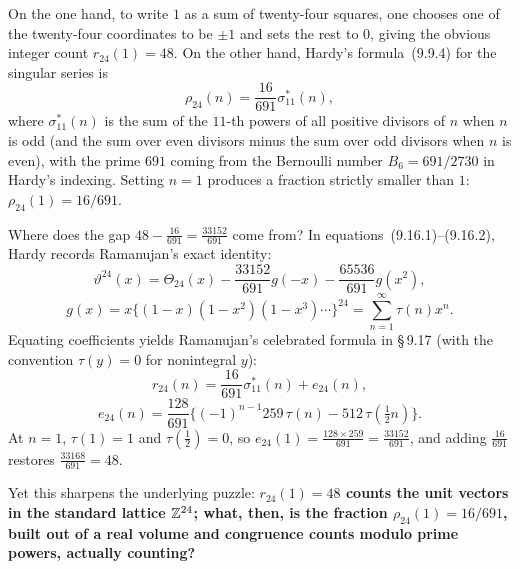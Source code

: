 On the one hand, to write $1$ as a sum of twenty-four squares, one chooses one of the twenty-four coordinates to be $\pm 1$ and sets the rest to $0$, giving the obvious integer count $r_{24}(1)=48$. On the other hand, Hardy's formula~(9.9.4) for the singular series is
\begin{equation*}\tag{9.9.4}
\rho_{24}(n)=\frac{16}{691}\sigma_{11}^*(n),
\end{equation*}
where $\sigma_{11}^*(n)$ is the sum of the $11$-th powers of all positive divisors of $n$ when $n$ is odd (and the sum over even divisors minus the sum over odd divisors when $n$ is even), with the prime $691$ coming from the Bernoulli number $B_6=691/2730$ in Hardy's indexing. Setting $n=1$ produces a fraction strictly smaller than $1$: $\rho_{24}(1)=16/691$.

Where does the gap $48-\frac{16}{691}=\frac{33152}{691}$ come from? In equations~(9.16.1)--(9.16.2), Hardy records Ramanujan's exact identity:
\begin{equation*}\tag{9.16.1}
\vartheta^{24}(x)=\Theta_{24}(x)-\frac{33152}{691}g(-x)-\frac{65536}{691}g(x^2),
\end{equation*}
\begin{equation*}\tag{9.16.2}
g(x)=x\bigl\{(1-x)(1-x^2)(1-x^3)\cdots\bigr\}^{24}=\sum_{n=1}^{\infty}\tau(n)x^n.
\end{equation*}
Equating coefficients yields Ramanujan's celebrated formula in \S\,9.17 (with the convention $\tau(y)=0$ for nonintegral $y$):
\begin{equation*}\tag{9.17.1}
r_{24}(n)=\frac{16}{691}\sigma_{11}^*(n)+e_{24}(n),
\end{equation*}
\begin{equation*}\tag{9.17.2}
e_{24}(n)=\frac{128}{691}\bigl\{(-1)^{n-1}259\,\tau(n)-512\,\tau(\tfrac12 n)\bigr\}.
\end{equation*}
At $n=1$, $\tau(1)=1$ and $\tau(\tfrac12)=0$, so $e_{24}(1)=\frac{128\times 259}{691}=\frac{33152}{691}$, and adding $\frac{16}{691}$ restores $\frac{33168}{691}=48$.

Yet this sharpens the underlying puzzle: \textbf{$r_{24}(1)=48$ counts the unit vectors in the standard lattice $\mathbb{Z}^{24}$; what, then, is the fraction $\rho_{24}(1)=16/691$, built out of a real volume and congruence counts modulo prime powers, actually counting?}

